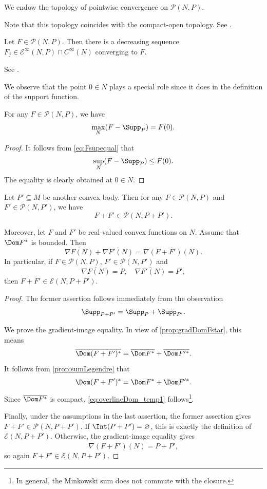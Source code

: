 \begin{definition}\label{def:pointwiseconv}
    We endow the topology of pointwise convergence on $\mathcal{P}(N,P)$.
\end{definition}
Note that this topology coincides with the compact-open topology. See \cite[Theorem~10.8]{Roc70}.

\begin{proposition}\label{prop:regularizationconvex}
    Let $F\in \mathcal{P}(N,P)$. Then there is a decreasing sequence $F_j\in \mathcal{E}^{\infty}(N,P)\cap C^{\infty}(N)$ converging to $F$.
\end{proposition}
See \cite[Lemma~2.2]{BB13}.

We observe that the point $0\in N$ plays a special role since it does in the definition of the support function.
\begin{proposition}\label{prop:convex:L462}
    For any $F\in \mathcal{P}(N,P)$, we have
    \[
    \max_{N}(F-\Supp_P)=F(0).
    \]
\end{proposition}
\begin{proof}
    It follows from \eqref{eq:Fsupequal} that
    \[
    \sup_{N}(F-\Supp_P)\leq F(0).
    \]
    The equality is clearly obtained at $0\in N$.
\end{proof}

\begin{lemma}\label{lma:grad_img_sum}
    Let $P'\subseteq M$ be another convex body. Then for any $F\in \mathcal{P}(N,P)$ and $F'\in \mathcal{P}(N,P')$, we have
    \[
    F+F'\in \mathcal{P}(N,P+P').
    \]

    Moreover, let $F$ and $F'$ be real-valued convex functions on $N$. Assume that $\Dom F^*$ is bounded. Then
    \[
    \overline{\nabla F(N)}+\overline{\nabla F'(N)}=\overline{\nabla (F+F')(N)}.
    \]
    In particular, if $F\in \mathcal{P}(N,P)$, $F'\in \mathcal{P}(N,P')$ and
    \[
    \overline{\nabla F(N)}=P,\quad \overline{\nabla F'(N)}=P',
    \]
    then $F+F'\in \mathcal{E}(N,P+P')$.
\end{lemma}
\begin{proof}
    The former assertion follows immediately from the observation
    \[
    \Supp_{P+P'}=\Supp_P+\Supp_{P'}.
    \]

    We prove the gradient-image equality. In view of \cref{prop:gradDomFstar}, this means
    \begin{equation}\label{eq:overlineDom_temp1}
    \overline{\Dom (F+F')^*}=\overline{\Dom F^*}+\overline{\Dom F'{}^*}.
    \end{equation}
    It follows from \cref{prop:sumLegendre} that
    \[
    \Dom (F+F')^*=\Dom F^*+\Dom F'{}^*.
    \]
    Since $\overline{\Dom F^*}$ is compact, \eqref{eq:overlineDom_temp1} follows\footnote{In general, the Minkowski sum does not commute with the closure.}.

    Finally, under the assumptions in the last assertion, the former assertion gives $F+F'\in\mathcal{P}(N,P+P')$. If $\Int(P+P')=\varnothing$, this is exactly the definition of $\mathcal{E}(N,P+P')$. Otherwise, the gradient-image equality gives
    \[
    \overline{\nabla (F+F')(N)}=P+P',
    \]
    so again $F+F'\in\mathcal{E}(N,P+P')$.
\end{proof}


